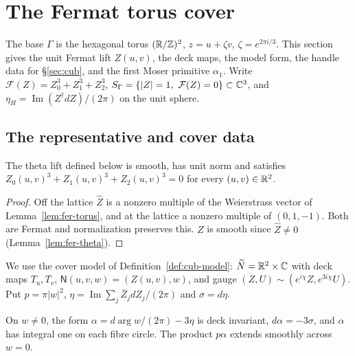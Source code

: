 \section{The Fermat torus cover}\label{sec:fer}

The base $\Gamma$ is the hexagonal torus $(\mathbb{R}/\mathbb{Z})^2$, $z=u+\zeta v$, $\zeta=e^{2\pi i/3}$. This section gives the unit Fermat lift $Z(u,v)$, the deck maps, the model form, the handle data for \S\ref{sec:cub}, and the first Moser primitive $\alpha_1$. Write $\mathcal F(Z)=Z_0^3+Z_1^3+Z_2^3$, $S_\Gamma=\{|Z|=1,\ \mathcal F(Z)=0\}\subset\mathbb{C}^3$, and $\eta_H=\operatorname{Im}(Z^\dagger dZ)/(2\pi)$ on the unit sphere.

\subsection{The representative and cover data}\label{sec:fer-curve}

\begin{lemma}\label{lem:fer-curve}
The theta lift defined below is smooth, has unit norm and satisfies
$Z_0(u,v)^3+Z_1(u,v)^3+Z_2(u,v)^3=0$ for every $(u,v)\in\mathbb{R}^2$.
\end{lemma}

\begin{proof}
Off the lattice $\hat Z$ is a nonzero multiple of the Weierstrass vector of Lemma~\ref{lem:fer-torus}, and at the lattice a nonzero multiple of $(0,1,-1)$. Both are Fermat and normalization preserves this. $Z$ is smooth since $\hat Z\ne0$ (Lemma~\ref{lem:fer-theta}).
\end{proof}

We use the cover model of Definition~\ref{def:cub-model}: $\widetilde N=\mathbb{R}^2\times\mathbb{C}$ with deck maps $T_u,T_v$, $\mathsf N(u,v,w)=(Z(u,v),w)$, and gauge $(Z,U)\sim(e^{i\chi}Z,e^{3i\chi}U)$. Put $p=\pi|w|^2$, $\eta=\operatorname{Im}\sum_j\bar Z_jdZ_j/(2\pi)$ and $\sigma=d\eta$.

\begin{lemma}\label{lem:fer-alpha}
On $w\ne0$, the form $\alpha=d\arg w/(2\pi)-3\eta$ is deck invariant, $d\alpha=-3\sigma$, and
$\alpha$ has integral one on each fibre circle. The product $p\alpha$ extends smoothly across $w=0$.
\end{lemma}

